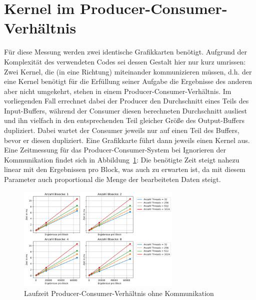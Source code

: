 \documentclass[11pt, abstract=on]{scrartcl}
\begin{document}
\section{Kernel im Producer-Consumer-Verhältnis}
Für diese Messung werden zwei identische Grafikkarten benötigt. Aufgrund der Komplexität des verwendeten Codes sei dessen Gestalt hier nur kurz umrissen: Zwei Kernel, die (in eine Richtung) miteinander kommunizieren müssen, d.h. der eine Kernel benötigt für die Erfüllung seiner Aufgabe die Ergebnisse des anderen aber nicht umgekehrt, stehen in einem Producer-Consumer-Verhältnis. Im vorliegenden Fall errechnet dabei der Producer den Durchschnitt eines Teils des Input-Buffers, während der Consumer diesen berechneten Durchschnitt ausliest und ihn vielfach in den entsprechenden Teil gleicher Größe des Output-Buffers dupliziert. Dabei wartet der Consumer jeweils nur auf einen Teil des Buffers, bevor er diesen dupliziert. Eine Grafikkarte führt dann jeweils einen Kernel aus.
Eine Zeitmessung für das Producer-Consumer-System bei Ignorieren der Kommunikation findet sich in Abbildung~\ref{fig:KommunikationOhne}: Die benötigte Zeit steigt nahezu linear mit den Ergebnissen pro Block, was auch zu erwarten ist, da mit diesem Parameter auch proportional die Menge der bearbeiteten Daten steigt.

\begin{figure} [htbp]
 	\centering
 		\includegraphics[width=0.7\textwidth]{Graph_KommunikationOhne.png}
 	\caption{Laufzeit Producer-Consumer-Verhältnis ohne Kommunikation}
 	\label{fig:KommunikationOhne}
\end{figure}
\end{document}
